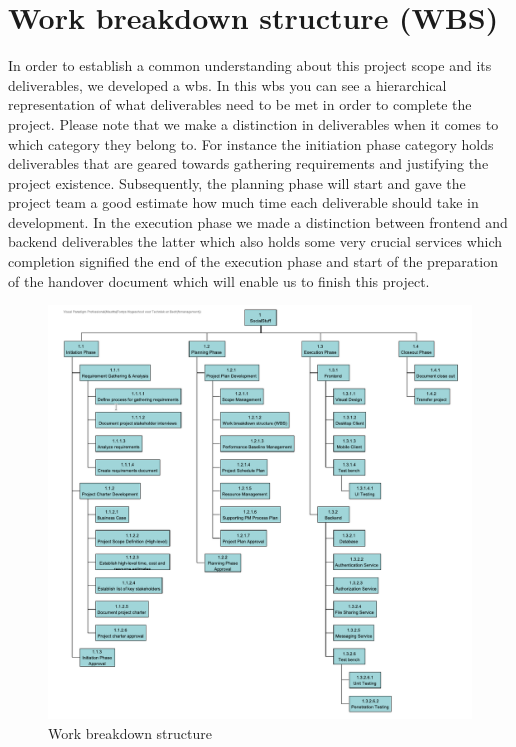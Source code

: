 \section{Work breakdown structure (WBS)}\label{sec:work-breakdown-structure-(wbs)}

In order to establish a common understanding about this project scope and its deliverables, we developed a \ac{wbs}.
In this \ac{wbs} you can see a hierarchical representation of what deliverables need to be met in order to complete
the project.
Please note that we make a distinction in deliverables when it comes to which category they belong to.
For instance the initiation phase category holds deliverables that are geared towards gathering requirements and
justifying the project existence.
Subsequently, the planning phase will start and gave the project team a good estimate how much time each deliverable
should take in development.
In the execution phase we made a distinction between frontend and backend deliverables the latter which also holds
some very crucial services which completion signified the end of the execution phase and start of the preparation of
the handover document which will enable us to finish this project.

\begin{figure}[H]
    \centering
    \includegraphics[width=1.0\textwidth]{./images/wbs}
    \caption{Work breakdown structure}
    \label{fig:figure40}
\end{figure}

